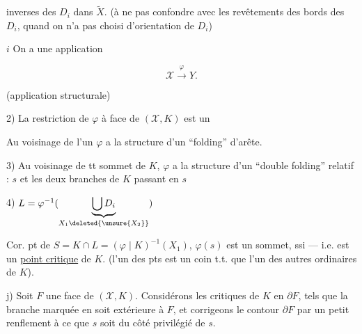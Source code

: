 
inverses des $D_i$ dans $\widetilde X$. (à ne pas confondre avec les revêtements des bords des $D_i$, quand on n'a pas choisi d'orientation de $D_i$)

\textcircled{$i$} On a une application

\[ \mathcal X \xrightarrow{\varphi} Y. \]

(application structurale) 

2) La restriction de $\varphi$ à  face de $(\mathcal X,K)$ est un   



Au voisinage de l'un   $\varphi$ a la structure d'un ``folding'' d'arête.

3) Au voisinage de tt  sommet de $K$, $\varphi$ a la structure d'un ``double folding'' relatif : $s$ et les deux branches de $K$ passant en $s$

4)     \quad $L=\varphi^{-1}(\underbrace{\bigcup D_i}_{X_1\deleted{\unsure{X_2}}})$


Cor.   pt de $S=K\cap L=(\varphi\mid K)^{-1}(X_1)$,  $\varphi(s)$ est un sommet, ssi    --- i.e. est un \uline{point critique} de $K$. (l'un des pts est un coin t.t. que l'un des autres ordinaires de $K$).

 j) Soit $F$ une face de $(\mathcal X,K)$. Considérons les   critiques de $K$ en $\partial F$, tels que la branche marquée en    soit extérieure à $F$, et corrigeons le contour $\partial F$ par un petit renflement   à ce que $s$ soit du côté privilégié de $s$.

